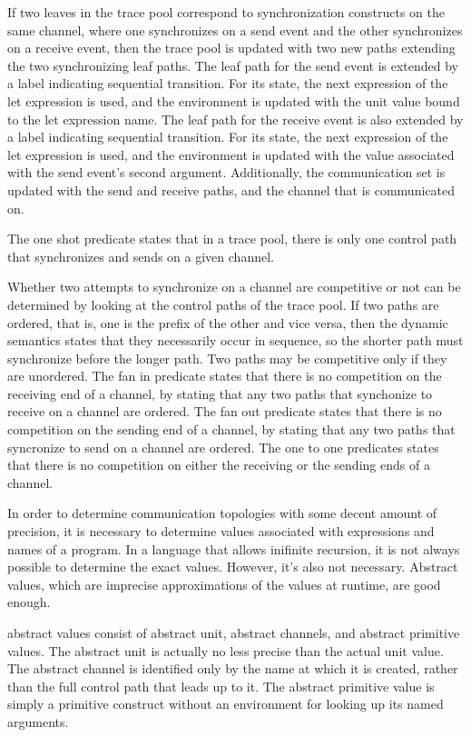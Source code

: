\documentclass{article}
\begin{document}
If two leaves in the trace pool correspond to synchronization constructs on the same channel, where one synchronizes on a send event
and the other synchronizes on a receive event, then the trace pool is updated with two new paths extending the two synchronizing leaf paths.  The leaf path for the send event is extended by a label indicating sequential transition.  For its state, the next expression of the let expression is used, and the environment is updated with the unit value bound to the let expression name.  The leaf path for the receive event is also extended by a label indicating sequential transition.  For its state, the next expression of the let expression is used, and the environment is updated with the value associated with the send event's second argument.   Additionally, the communication set is updated with the send and receive paths, and the channel that is communicated on. 


The one shot predicate states that in a trace pool, there is only one control path that synchronizes and sends on a given channel.

Whether two attempts to synchronize on a channel are competitive or not can be determined by looking at the control paths of the trace pool.  If two paths are ordered, that is, one is the prefix of the other and vice versa, then the dynamic semantics states that they necessarily occur in sequence, so the shorter path must synchronize before the longer path.  Two paths may be competitive only if they are unordered. 
The fan in predicate states that there is no competition on the receiving end of a channel, by stating that any two paths that synchonize to receive on a channel are ordered.
The fan out predicate states that there is no competition on the sending end of a channel, by stating that any two paths that syncronize to send on a channel are ordered. 
The one to one predicates states that there is no competition on either the receiving or the sending ends of a channel. 


In order to determine communication topologies with some decent amount of precision, it is necessary to determine values associated with expressions and names of a program.  In a language that allows inifinite recursion, it is not always possible to determine the exact values.  However, it's also not necessary.  Abstract values, which are imprecise approximations of the values at runtime, are good enough.

abstract values consist of abstract unit, abstract channels, and abstract primitive values.  The abstract unit is actually no less precise than the actual unit value.  The abstract channel is identified only by the name at which it is created, rather than the full control path that leads up to it.  The abstract primitive value is simply a primitive construct without an environment for looking up its named arguments. 
\end{document}
